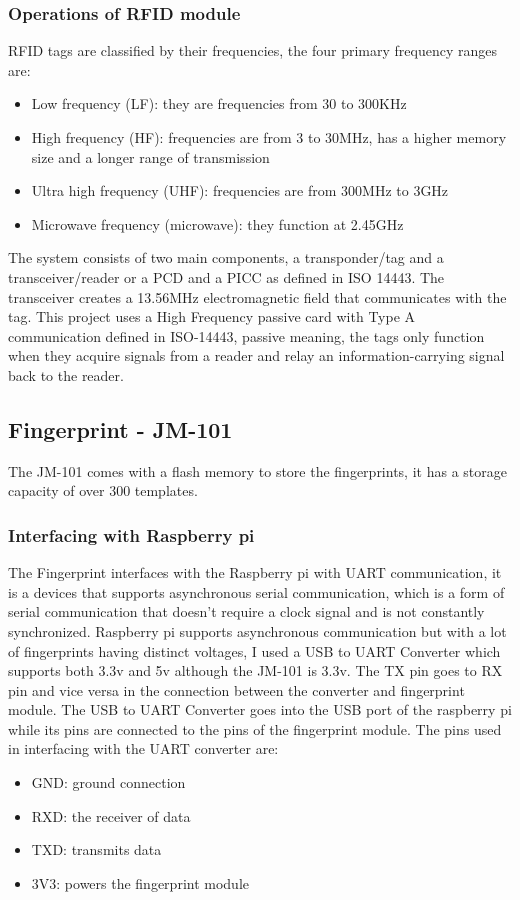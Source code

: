 \subsubsection{Operations of RFID module}
RFID tags are classified by their frequencies, the four primary frequency ranges are:
\begin{itemize}
  \item Low frequency (LF): they are frequencies from 30 to 300KHz
  \item High frequency (HF): frequencies are from 3 to 30MHz, has a higher memory size and a longer range of transmission
  \item Ultra high frequency (UHF): frequencies are from 300MHz to 3GHz
  \item Microwave frequency (microwave): they function at 2.45GHz 
\end{itemize}
The system consists of two main components, a transponder/tag and a transceiver/reader or a PCD and a PICC as defined in ISO 14443. The transceiver creates a 13.56MHz electromagnetic field that communicates with the tag. 
This project uses a High Frequency passive card with Type A communication defined in ISO-14443, passive meaning, the tags only function when they acquire signals from a reader and relay an information-carrying signal back to the reader. 



\subsection{Fingerprint - JM-101}
The JM-101 comes with a flash memory to store the fingerprints, it has a storage capacity of over 300 templates. 
\subsubsection{Interfacing with Raspberry pi}
The Fingerprint interfaces with the Raspberry pi with UART communication, it is a devices that supports asynchronous serial communication, which is a form of serial communication that doesn't require a clock signal and is not constantly synchronized. Raspberry pi supports asynchronous communication but with a lot of fingerprints having distinct voltages, I used a USB to UART Converter which supports both 3.3v and 5v although the JM-101 is 3.3v. The TX pin goes to RX pin and vice versa in the connection between the converter and fingerprint module. The USB to UART Converter goes into the USB port of the raspberry pi while its pins are connected to the pins of the fingerprint module.
The pins used in interfacing with the UART converter are:
\begin{itemize}
  \item GND: ground connection
  \item RXD: the receiver of data
  \item TXD: transmits data
  \item 3V3: powers the fingerprint module
\end{itemize}

